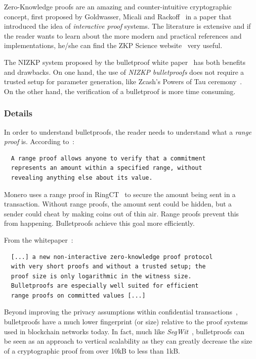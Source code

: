 Zero-Knowledge proofs are an amazing and counter-intuitive cryptographic concept, first proposed by Goldwasser, Micali and Rackoff~\cite{0_knowledge} in a paper that introduced the idea of \emph{interactive proof} systems. The literature is extensive and if the reader wants to learn about the more modern and practical references and implementations, he/she can find the ZKP Science website~\cite{zkp_science} very useful.

The NIZKP system proposed by the bulletproof white paper~\cite{bulletproofs} has both benefits and drawbacks. On one hand, the use of \emph{NIZKP bulletproofs} does not require a trusted setup for parameter generation, like Zcash’s Powers of Tau ceremony~\cite{powers_of_tau}. On the other hand, the verification of a bulletproof is more time consuming.

\subsubsection{Details}
In order to understand bulletproofs, the reader needs to understand what a \emph{range proof} is. According to~\cite{getmonero}:
\begin{verbatim}
  A range proof allows anyone to verify that a commitment
  represents an amount within a specified range, without
  revealing anything else about its value.
\end{verbatim}

Monero uses a range proof in RingCT~\cite{ringCT} to secure the amount being sent in a transaction. Without range proofs, the amount sent could be hidden, but a sender could cheat by making coins out of thin air. Range proofs prevent this from happening. Bulletproofs achieve this goal more efficiently.
\pagebreak

\noindent From the whitepaper~\cite{bulletproofs}:
\begin{verbatim}
  [...] a new non-interactive zero-knowledge proof protocol
  with very short proofs and without a trusted setup; the
  proof size is only logarithmic in the witness size.
  Bulletproofs are especially well suited for efficient
  range proofs on committed values [...]
\end{verbatim}

Beyond improving the privacy assumptions within confidential transactions~\cite{ringCT}, bulletproofs have a much lower fingerprint (or size) relative to the proof systems used in blockchain networks today. In fact, much like \emph{SegWit}~\cite{segwit}, bulletproofs can be seen as an approach to vertical scalability as they can greatly decrease the size of a cryptographic proof from over 10kB to less than 1kB.

